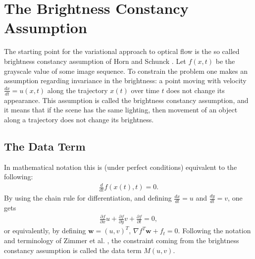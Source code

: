 \chapter{The Brightness Constancy Assumption}
The starting point for the variational approach to optical flow is the so called brightness constancy assumption of Horn and Schunck \cite{HS}. Let $f(x,t)$ be the grayscale value of some image sequence. To constrain the problem one makes an assumption regarding invariance in the brightness: a point moving with velocity $\frac{dx}{dt} = u(x,t)$ along the trajectory $x(t)$ over time $t$ does not change its appearance. This assumption is called the brightness constancy assumption, and it means that if the scene has the same lighting, then movement of an object along a trajectory does not change its brightness.
\section{The Data Term}
In mathematical notation this is (under perfect conditions) equivalent to the following:
\begin{align*}
\frac{d}{dt}f(x(t),t) = 0.
\end{align*}
By using the chain rule for differentiation, and defining $\frac{dx}{dt} = u$ and $\frac{dy}{dt} = v$, one gets
\begin{align*}
\frac{\partial f}{\partial x} u + \frac{\partial f}{\partial y} v + \frac{\partial f}{\partial t} = 0,
\end{align*}
or equivalently, by defining $\textbf{w} = (u,v)^T$, $\nabla f^T  \textbf{w} + f_t = 0$. Following the notation and terminology of Zimmer et al. \cite{zimmer2011optic}, the constraint coming from the brightness constancy assumption is called the data term $M(u,v)$.

